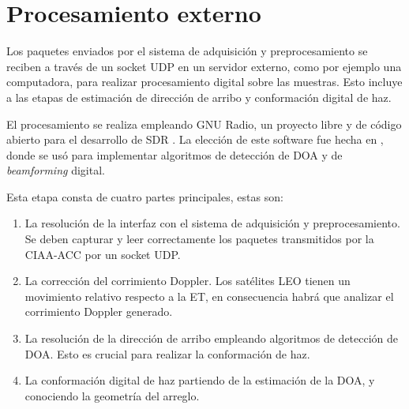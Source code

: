 \documentclass[../../main.tex]{subfiles}
\begin{document}


\section{Procesamiento externo}\label{sec::procesamiento-externo}
Los paquetes enviados por el sistema de adquisición y preprocesamiento se reciben a través de un socket UDP en un servidor externo, como por ejemplo una computadora, para realizar procesamiento digital sobre las muestras. Esto incluye a las etapas de estimación de dirección de arribo y conformación digital de haz.

El procesamiento se realiza empleando GNU Radio, un proyecto libre y de código abierto para el desarrollo de SDR \cite{GNURadio}. La elección de este software fue hecha en \cite{proyecto-grigo}, donde se usó para implementar algoritmos de detección de DOA y de \textit{beamforming} digital.

Esta etapa consta de cuatro partes principales, estas son:
\begin{enumerate}
    \item La resolución de la interfaz con el sistema de adquisición y preprocesamiento. Se deben capturar y leer correctamente los paquetes transmitidos por la CIAA-ACC por un socket UDP.
    \item La corrección del corrimiento Doppler. Los satélites LEO tienen un movimiento relativo respecto a la ET, en consecuencia habrá que analizar el corrimiento Doppler generado.
    \item La resolución de la dirección de arribo empleando algoritmos de detección de DOA. Esto es crucial para realizar la conformación de haz.
    \item La conformación digital de haz partiendo de la estimación de la DOA, y conociendo la geometría del arreglo.
\end{enumerate}

\end{document}
